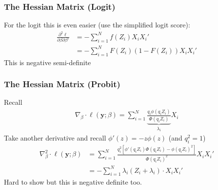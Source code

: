 \documentclass[aspectratio=169,11pt]{beamer}
\begin{document}
\begin{frame}
\frametitle{The Hessian Matrix (Logit)}
For the logit this is even easier (use the simplified logit score):
\begin{align*}
\frac{\partial^2 \ell }{\partial \beta \partial \beta'}  &= - \sum_{i=1}^N f(Z_i) X_i X_i' \\
&= - \sum_{i=1}^N F(Z_i) (1- F(Z_i)) X_i X_i'
\end{align*}
This is \alert{negative semi-definite}
\end{frame}

\begin{frame}
\frametitle{The Hessian Matrix (Probit)}
Recall
\begin{align*}
\nabla_{\beta} \cdot \ell(\symbf{y}; \beta)= \sum_{i=1}^N \underbrace{\frac{ q_i \phi(q_i Z_i)}{\Phi(q_i Z_i)}}_{\lambda_i} X_i
\end{align*}
Take another derivative and recall $\phi'(z) = - z \phi(z)$ (and $q_i^2=1$)
\begin{align*}
\nabla_{\beta}^2 \cdot \ell(\symbf{y}; \beta)&= \sum_{i=1}^N \frac{q_i^2 \left[\phi'(q_i Z_i) \Phi(q_i Z_i) - \phi(q_i Z_i)^2\right]}{\Phi(q_i Z_i)^2}  X_i X_i' \\
&= - \sum_{i=1}^N \lambda_i( Z_i + \lambda_i) \cdot X_i X_i'
\end{align*}
Hard to show but this is \alert{negative definite} too.
\end{frame}


\end{document}
